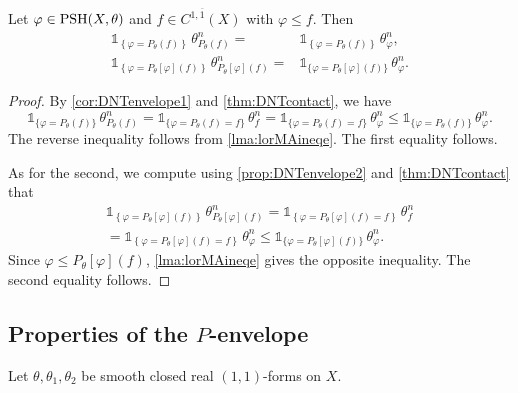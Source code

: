 \begin{proposition}\label{prop:DNTenvelope3}
    Let $\varphi\in\mathrm{PSH}(X,\theta)$ and $f\in C^{1,\overline{1}}(X)$ with $\varphi\leq f$. Then
    \[
    \begin{aligned}
        \mathds{1}_{\left\{\varphi=P_\theta(f)\right\}}\,\theta^n_{P_\theta(f)} =& \mathds{1}_{\left\{\varphi=P_\theta(f)\right\}}\,\theta^n_\varphi, \\
        \mathds{1}_{\left\{\varphi=P_\theta[\varphi](f)\right\}}\,\theta^n_{P_\theta[\varphi](f)} =& \mathds{1}_{\{\varphi=P_\theta[\varphi](f)\}}\,\theta^n_\varphi.
    \end{aligned}
    \]
\end{proposition}
\begin{proof}
    By \cref{cor:DNTenvelope1} and \cref{thm:DNTcontact}, we have
    \[
        \mathds{1}_{\{\varphi=P_\theta(f)\}}\,\theta^n_{P_\theta(f)}=\mathds{1}_{\{\varphi=P_\theta(f)=f\}}\,\theta^n_{f}=\mathds{1}_{\{\varphi=P_\theta(f)=f\}}\,\theta^n_{\varphi}\leq \mathds{1}_{\{\varphi=P_\theta(f)\}}\,\theta^n_{\varphi}.
    \]
    The reverse inequality follows from \cref{lma:lorMAineqe}. The first equality follows.

    As for the second, we compute using \cref{prop:DNTenvelope2} and \cref{thm:DNTcontact} that
    \[
    \begin{split}
    \mathds{1}_{\left\{\varphi=P_\theta[\varphi](f)\right\}}\,\theta^n_{P_\theta[\varphi](f)}=\mathds{1}_{\left\{\varphi=P_\theta[\varphi](f)=f\right\}}\,\theta^n_{f}\\
    =\mathds{1}_{\left\{\varphi=P_\theta[\varphi](f)=f\right\}}\,\theta_{\varphi}^n\leq \mathds{1}_{\{\varphi=P_\theta[\varphi](f)\}}\,\theta^n_\varphi.
    \end{split}
    \]
    Since $\varphi\leq P_{\theta}[\varphi](f)$, \cref{lma:lorMAineqe} gives the opposite inequality. The second equality follows.
\end{proof}

\subsection{Properties of the \texorpdfstring{$P$}{P}-envelope}
\label{subsec:Penv_prop}
Let $\theta,\theta_1,\theta_2$ be smooth closed real $(1,1)$-forms on $X$.

